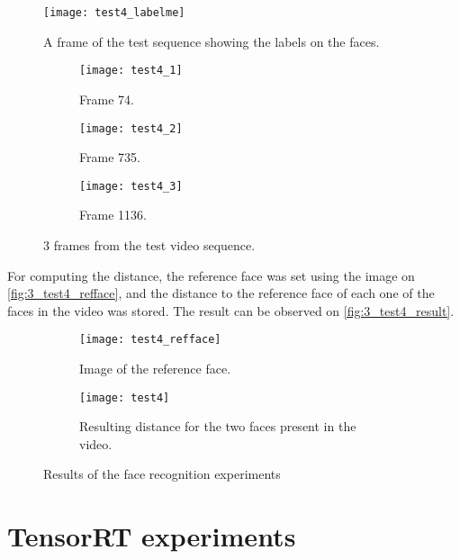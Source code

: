 \begin{figure}[h]
	\centering
	\texttt{[image: test4\_labelme]}
	\caption{A frame of the test sequence showing the labels on the faces.}
	\label{fig:3_test4_labelme}
\end{figure}



\begin{figure}[h]
	\centering
	\begin{subfigure}[b]{0.3\linewidth}
		\centering
		\texttt{[image: test4\_1]}
		\caption{Frame 74.}
	\end{subfigure}
	\begin{subfigure}[b]{0.3\linewidth}
		\centering
		\texttt{[image: test4\_2]}
		\caption{Frame 735.}
	\end{subfigure}
	\begin{subfigure}[b]{0.3\linewidth}
		\centering
		\texttt{[image: test4\_3]}
		\caption{Frame 1136.}
	\end{subfigure}
	\caption{3 frames from the test video sequence.}
	\label{fig:3_test4_frames}
\end{figure}


For computing the distance, the reference face was set using the image on \autoref{fig:3_test4_refface}, and the distance to the reference face of each one of the faces in the video was stored. The result can be observed on \autoref{fig:3_test4_result}.


\begin{figure}[h]
	\centering
	\begin{subfigure}[b]{0.25\linewidth}
		\centering
		\texttt{[image: test4\_refface]}
		\caption{Image of the reference face.}
		\label{fig:3_test4_refface}
	\end{subfigure}
	\begin{subfigure}[b]{0.7\linewidth}
		\centering
		\texttt{[image: test4]}
		\caption{Resulting distance for the two faces present in the video.}
		\label{fig:3_test4_result}
	\end{subfigure}
	\caption{Results of the face recognition experiments}
	\label{fig:3_test4}
\end{figure}

\section{TensorRT experiments}

